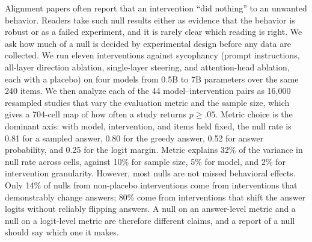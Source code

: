 Alignment papers often report that an intervention ``did nothing'' to an unwanted behavior.
Readers take such null results either as evidence that the behavior is robust or as a failed experiment, and it is rarely clear which reading is right.
We ask how much of a null is decided by experimental design before any data are collected.
We run eleven interventions against sycophancy (prompt instructions, all-layer direction ablation, single-layer steering, and attention-head ablation, each with a placebo) on four \qwen models from 0.5B to 7B parameters over the same 240 items.
We then analyze each of the 44 model--intervention pairs as 16,000 resampled studies that vary the evaluation metric and the sample size, which gives a 704-cell map of how often a study returns $p \ge .05$.
Metric choice is the dominant axis: with model, intervention, and items held fixed, the null rate is 0.81 for a sampled answer, 0.80 for the greedy answer, 0.52 for answer probability, and 0.25 for the logit margin.
Metric explains 32\% of the variance in null rate across cells, against 10\% for sample size, 5\% for model, and 2\% for intervention granularity.
However, most nulls are not missed behavioral effects.
Only 14\% of nulls from non-placebo interventions come from interventions that demonstrably change answers; 80\% come from interventions that shift the answer logits without reliably flipping answers.
A null on an answer-level metric and a null on a logit-level metric are therefore different claims, and a report of a null should say which one it makes.
